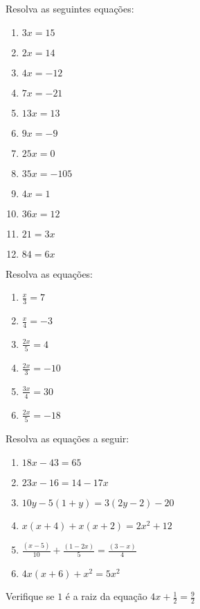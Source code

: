 				
				\item Resolva as seguintes equações:
					\begin{multicols}{4}					
					\begin{enumerate}
						\item $3x=15$
						\item $2x=14$
						\item $4x=-12$
						\item $7x=-21$
						\item $13x=13$
						\item $9x=-9$
						\item $25x=0$
						\item $35x=-105$
						\item $4x=1$
						\item $36x=12$
						\item $21=3x$
						\item $84=6x$
					\end{enumerate}							
					\end{multicols}
				\item Resolva as equações:
					\begin{multicols}{3}
					\begin{enumerate}
						\item $\displaystyle\frac{x}{3}=7$
						\item $\displaystyle\frac{x}{4}=-3$
						\item $\displaystyle\frac{2x}{5}=4$
						\item $\displaystyle\frac{2x}{3}=-10$
						\item $\displaystyle\frac{3x}{4}=30$
						\item $\displaystyle\frac{2x}{5}=-18$
					\end{enumerate}
					\end{multicols}				
							
				\item Resolva as equações a seguir:
					\begin{multicols}{2}
					\begin{enumerate}
						\item $18x - 43 = 65$
						\item $23x - 16 = 14 - 17x$
						\item $10y - 5 (1 + y) = 3 (2y - 2) - 20$
						\item $x(x + 4) + x(x + 2) = 2x^2 + 12$
						\item $\displaystyle\frac{(x - 5)}{10} + \frac{(1 - 2x)}{5} = \frac{(3-x)}{4}$                                 
						\item $4x (x + 6) + x^2 = 5x^2$
					\end{enumerate}				
					\end{multicols}
				\item Verifique se $1$ é a raiz da equação $\displaystyle{4x + \frac{1}{2} = \frac{9}{2}}$
						
